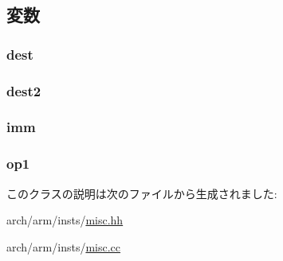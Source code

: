 \subsection{変数}
\hypertarget{classMrrcOp_aec72e8e45bdc87abeeeb75d2a8a9a716}{
\subsubsection[{dest}]{ {\bf dest}}}
\label{classMrrcOp_aec72e8e45bdc87abeeeb75d2a8a9a716}
\hypertarget{classMrrcOp_a0425ad33e25c8198da341b8d8c01fcba}{
\subsubsection[{dest2}]{ {\bf dest2}}}
\label{classMrrcOp_a0425ad33e25c8198da341b8d8c01fcba}
\hypertarget{classMrrcOp_a3aa9e175bd81b38df0e566643d5d4f8d}{
\subsubsection[{imm}]{ {\bf imm}}}
\label{classMrrcOp_a3aa9e175bd81b38df0e566643d5d4f8d}
\hypertarget{classMrrcOp_a4c465c43ad568f8bcf8ae71480e9cfea}{
\subsubsection[{op1}]{ {\bf op1}}}
\label{classMrrcOp_a4c465c43ad568f8bcf8ae71480e9cfea}


このクラスの説明は次のファイルから生成されました:\begin{DoxyCompactItemize}
\item 
arch/arm/insts/\hyperlink{arch_2arm_2insts_2misc_8hh}{misc.hh}\item 
arch/arm/insts/\hyperlink{arch_2arm_2insts_2misc_8cc}{misc.cc}\end{DoxyCompactItemize}
